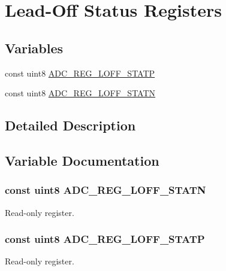 \hypertarget{group___l_o_f_f_stat_reg}{\section{Lead-\/\-Off Status Registers}
\label{group___l_o_f_f_stat_reg}
}
\subsection*{Variables}
\begin{DoxyCompactItemize}
\item 
const uint8 \hyperlink{group___l_o_f_f_stat_reg_ga40a2d5e3beb89adaca834b960a16f8b3}{A\-D\-C\-\_\-\-R\-E\-G\-\_\-\-L\-O\-F\-F\-\_\-\-S\-T\-A\-T\-P}
\item 
const uint8 \hyperlink{group___l_o_f_f_stat_reg_gaebe0ef34e8d67366fa53a457417089b6}{A\-D\-C\-\_\-\-R\-E\-G\-\_\-\-L\-O\-F\-F\-\_\-\-S\-T\-A\-T\-N}
\end{DoxyCompactItemize}


\subsection{Detailed Description}


\subsection{Variable Documentation}
\hypertarget{group___l_o_f_f_stat_reg_gaebe0ef34e8d67366fa53a457417089b6}{
\subsubsection[{A\-D\-C\-\_\-\-R\-E\-G\-\_\-\-L\-O\-F\-F\-\_\-\-S\-T\-A\-T\-N}]{\setlength{\rightskip}{0pt plus 5cm}const uint8 A\-D\-C\-\_\-\-R\-E\-G\-\_\-\-L\-O\-F\-F\-\_\-\-S\-T\-A\-T\-N}}\label{group___l_o_f_f_stat_reg_gaebe0ef34e8d67366fa53a457417089b6}
Read-\/only register. \hypertarget{group___l_o_f_f_stat_reg_ga40a2d5e3beb89adaca834b960a16f8b3}{
\subsubsection[{A\-D\-C\-\_\-\-R\-E\-G\-\_\-\-L\-O\-F\-F\-\_\-\-S\-T\-A\-T\-P}]{\setlength{\rightskip}{0pt plus 5cm}const uint8 A\-D\-C\-\_\-\-R\-E\-G\-\_\-\-L\-O\-F\-F\-\_\-\-S\-T\-A\-T\-P}}\label{group___l_o_f_f_stat_reg_ga40a2d5e3beb89adaca834b960a16f8b3}
Read-\/only register. 